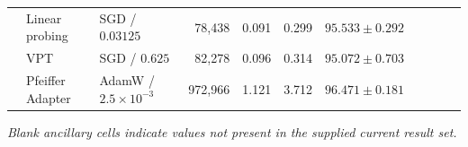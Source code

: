 \documentclass[pdflatex,sn-mathphys-num]{sn-jnl}
\theoremstyle{thmstyleone}
\theoremstyle{thmstyletwo}
\theoremstyle{thmstylethree}
\begin{document}
\begin{table}[!t]
{\begin{tabular}{@{}rllrrrrrrrr@{}}
 & Linear probing & SGD / $0.03125$ & 78,438 & 0.091 & 0.299 & $95.533\pm0.292$ &  &  &  &  \\
 & VPT~\cite{jia2022vpt} & SGD / $0.625$ & 82,278 & 0.096 & 0.314 & $95.072\pm0.703$ &  &  &  &  \\
 & Pfeiffer Adapter & AdamW / $2.5\times10^{-3}$ & 972,966 & 1.121 & 3.712 & $96.471\pm0.181$ &  &  &  &  \\
\bottomrule
\end{tabular}%
}
\vspace{2pt}
{\footnotesize\textit{Blank ancillary cells indicate values not present in the supplied current result set.}}
\end{table}

\begin{table}[!t]
\centering
\caption{Three-seed comparison on VTAB-Caltech101 using ViT-B/16~\cite{dosovitskiy2021vit}. The VTAB-1k protocol uses \texttt{train800} for training, \texttt{val200} for validation, and the official test set for testing. All methods are trained for 10 epochs with batch size 32 and $224\times224$ inputs. Results are mean $\pm$ sample standard deviation over seeds $\{0,1,2\}$.}
\label{tab:vtab_caltech101_vit_recovered_corrected}
\scriptsize
\setlength{\tabcolsep}{4.0pt}
\renewcommand{\arraystretch}{1.10}
\end{table}
\end{document}
